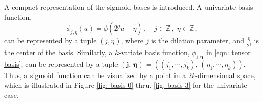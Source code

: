 A compact representation of the sigmoid bases is introduced.
A univariate basis function,
\begin{equation*}
    {\phi}_{j,\eta}(u) = {\phi}(2^j u-\eta) \,,\quad j\in \mathbb{Z} \,,\;\eta \in \mathbb{Z}\,,
    \label{eqn: self similar sigmoid}
\end{equation*}
can be represented by a tuple $(j, \eta)$,
where $j$ is the dilation parameter, and $\frac{\eta}{2^j}$ is
the center of the basis.
Similarly, a $k$-variate basis function, $\phi_{\boldsymbol{j}, \boldsymbol{\eta}}$ in
\eqref{eqn: tensor basis}, can be represented by a tuple $\left(\boldsymbol{j}, \,
\boldsymbol{\eta}\right) 
= \left((j_1,\cdots, j_k), \, \left(\eta_1, \cdots, \eta_k\right)\right)$.
Thus, a sigmoid function can be visualized by a point in a $2k$-dimensional space,
which is illustrated in Figure \ref{fig: basis 0} thru. \ref{fig: basis 3} 
for the univariate case.\\
